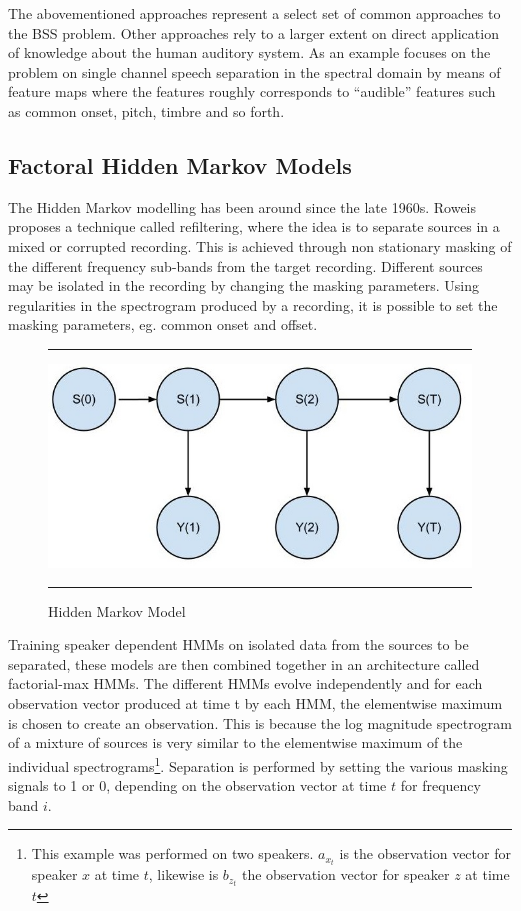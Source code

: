 The abovementioned approaches represent a select set of common
approaches to the  BSS problem. Other approaches rely to a larger
extent on direct application of knowledge about the human auditory
system. As an example \cite{bach} focuses on the problem on single channel speech
separation in the spectral domain by means of feature
maps where the features roughly corresponds to ``audible'' features such
as common onset, pitch, timbre and so forth. 



\newpage
\subsection{Factoral Hidden Markov Models} %
The Hidden Markov modelling has been around since the late 1960s. Roweis\cite{roweisOneMic} proposes a technique called refiltering, where the idea is to separate sources in a mixed or corrupted recording. This is achieved through non stationary masking of the different frequency sub-bands from the target recording. Different sources may be isolated in the recording by changing the masking parameters. Using regularities in the spectrogram produced by a recording, it is possible to set the masking parameters, eg. common onset and offset.

\begin{figure}[h]
  \centering
  \hrule
  \includegraphics[width = .9\textwidth]{hmm}
  \hrule
  \caption{Hidden Markov Model}
  \label{hmm_figure}
\end{figure}



Training speaker dependent HMMs on isolated data from the sources to be separated, these models are then combined together in an architecture called factorial-max HMMs. The different HMMs evolve independently and for each observation vector produced at time t by each HMM, the elementwise maximum is chosen to create an observation. This is because the log magnitude spectrogram of a mixture of sources is very similar to the elementwise maximum of the individual spectrograms\footnote{This example was performed on two speakers. $a_{x_{t}}$ is the observation vector for speaker $x$ at time $t$, likewise is $b_{z_{t}}$ the observation vector for speaker $z$ at time $t$}. Separation is performed by setting the various masking signals to 1 or 0, depending on the observation vector at time $t$ for frequency band $i$.

